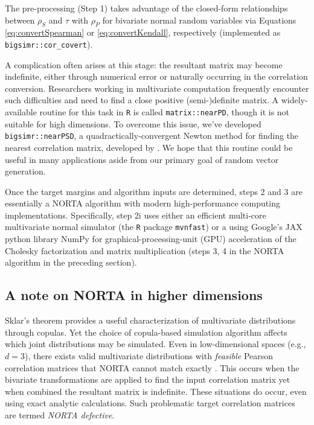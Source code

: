 \documentclass[]{article}
\begin{document}
The pre-processing (Step 1) takes advantage of the closed-form relationships between \(\rho_S\) and \(\tau\) with \(\rho_P\) for bivariate normal random variables via Equations \eqref{eq:convertSpearman} or \eqref{eq:convertKendall}, respectively (implemented as \texttt{bigsimr::cor\_covert}).

A complication often arises at this stage: the resultant matrix may become indefinite, either through numerical error or naturally occurring in the correlation conversion.
Researchers working in multivariate computation frequently encounter such difficulties and need to find a close positive (semi-)definite matrix.
A widely-available routine for this task in \texttt{R} is called \texttt{matrix::nearPD}, though it is not suitable for high dimensions.
To overcome this issue, we've developed \texttt{bigsimr::nearPSD}, a quadractically-convergent Newton method for finding the nearest correlation matrix, developed by \citet{QS2006}.
We hope that this routine could be useful in many applications aside from our primary goal of random vector generation.

Once the target margins and algorithm inputs are determined, steps 2 and 3 are essentially a NORTA algorithm with modern high-performance computing implementations.
Specifically, step 2i uses either an efficient multi-core multivariate normal simulator (the \texttt{R} package \texttt{mvnfast}\citep{Fasiolo2016}) or a using Google's JAX python library NumPy for graphical-processing-unit (GPU) acceleration of the Cholesky factorization and matrix multiplication (steps 3, 4 in the NORTA algorithm in the preceding section).

\hypertarget{a-note-on-norta-in-higher-dimensions}{%
\subsection{A note on NORTA in higher dimensions}\label{a-note-on-norta-in-higher-dimensions}}

Sklar's theorem provides a useful characterization of multivariate distributions through copulas.
Yet the choice of copula-based simulation algorithm affects which joint distributions may be simulated.
Even in low-dimensional spaces (e.g., \(d=3\)), there exists valid multivariate distributions with \emph{feasible} Pearson correlation matrices that NORTA cannot match exactly \citep{LH75}.
This occurs when the bivariate transformations are applied to find the input correlation matrix yet when combined the resultant matrix is indefinite.
These situations do occur, even using exact analytic calculations. Such problematic target correlation matrices are termed \emph{NORTA defective}.
\end{document}
